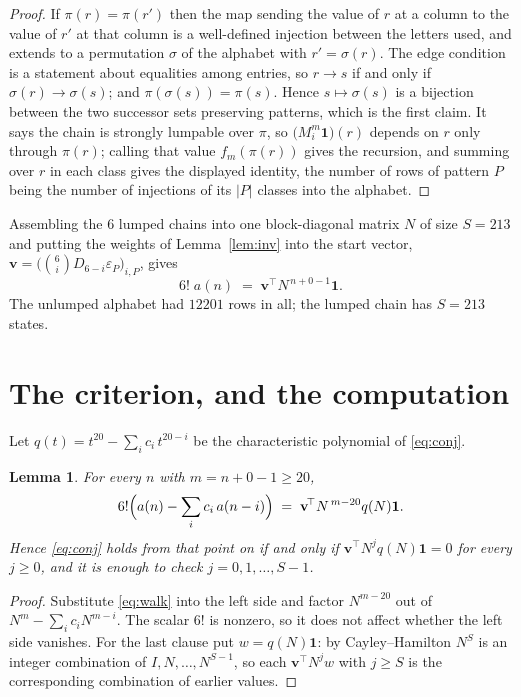 \documentclass[11pt,a4paper]{article}
\theoremstyle{plain}
\newtheorem{lemma}[theorem]{Lemma}
\theoremstyle{definition}
\begin{document}
\begin{proof}
If $\pi(r)=\pi(r')$ then the map sending the value of $r$ at a column to the value of $r'$
at that column is a well-defined injection between the letters used, and extends to a
permutation $\sigma$ of the alphabet with $r'=\sigma(r)$. The edge condition is a statement
about equalities among entries, so $r\to s$ if and only if $\sigma(r)\to\sigma(s)$; and
$\pi(\sigma(s))=\pi(s)$. Hence $s\mapsto\sigma(s)$ is a bijection between the two successor
sets preserving patterns, which is the first claim. It says the chain is strongly lumpable
over $\pi$, so $\bigl(M_i^{m}\mathbf{1}\bigr)(r)$ depends on $r$ only through $\pi(r)$;
calling that value $f_m(\pi(r))$ gives the recursion, and summing over $r$ in each class
gives the displayed identity, the number of rows of pattern $P$ being the number of
injections of its $|P|$ classes into the alphabet.
\end{proof}

Assembling the $6$ lumped chains into one block-diagonal matrix $N$ of size $S=213$ and
putting the weights of Lemma~\ref{lem:inv} into the start vector,
$\mathbf{v}=\bigl(\binom{6}{i}D_{6-i}\varepsilon_P\bigr)_{i,P}$, gives
\begin{equation}\label{eq:walk}
6!\;a(n)\;=\;\mathbf{v}^{\!\top}N^{\,n+0-1}\mathbf{1} .
\end{equation}
The unlumped alphabet had $12201$ rows in all; the lumped chain has $S=213$ states.

\section{The criterion, and the computation}

Let $q(t)=t^{20}-\sum_i c_i\,t^{20-i}$ be the characteristic polynomial of
\eqref{eq:conj}.

\begin{lemma}\label{lem:crit}
For every $n$ with $m=n+0-1\ge20$,
\[
6!\Bigl(a(n)-\sum_i c_i\,a(n-i)\Bigr)\;=\;\mathbf{v}^{\!\top}N^{\,m-20}q(N)\mathbf{1} .
\]
Hence \eqref{eq:conj} holds from that point on if and only if
$\mathbf{v}^{\!\top}N^{j}q(N)\mathbf{1}=0$ for every $j\ge0$, and it is enough to check
$j=0,1,\dots,S-1$.
\end{lemma}

\begin{proof}
Substitute \eqref{eq:walk} into the left side and factor $N^{m-20}$ out of
$N^{m}-\sum_i c_iN^{m-i}$. The scalar $6!$ is nonzero, so it does not affect whether
the left side vanishes. For the last clause put $w=q(N)\mathbf{1}$: by Cayley--Hamilton
$N^{S}$ is an integer combination of $I,N,\dots,N^{S-1}$, so each
$\mathbf{v}^{\!\top}N^{j}w$ with $j\ge S$ is the corresponding combination of earlier
values.
\end{proof}
\end{document}
